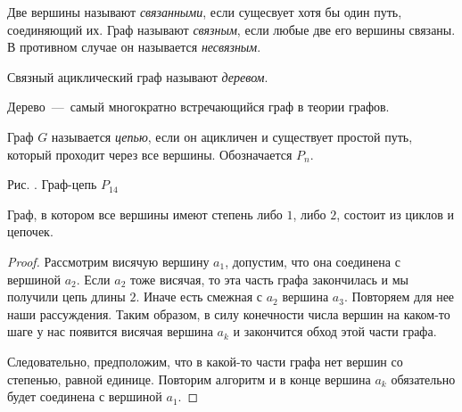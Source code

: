 \begin{definition}
	Две вершины называют \emph{связанными}, если сущесвует хотя бы один путь, соединяющий их. Граф называют \emph{связным}, если любые две его вершины связаны. В противном случае он называется \emph{несвязным}.
\end{definition}

\begin{definition}
	Связный ациклический граф называют \emph{деревом}.
\end{definition}

	Дерево~---~самый многократно встречающийся граф в теории графов. 
	
\begin{definition}
	Граф $G$ называется \emph{цепью}, если он ацикличен и существует простой путь, который проходит через все вершины. Обозначается $P_n$.
\end{definition}

\begin{center}
\newline
\newline
	\small Рис. \images. Граф-цепь $P_14$
\end{center}

\begin{statement}
	Граф, в котором все вершины имеют степень либо $1$, либо $2$, состоит из циклов и цепочек.

\begin{proof}
	Рассмотрим висячую вершину $a_1$, допустим, что она соединена с вершиной $a_2$. Если $a_2$ тоже висячая, то эта часть графа закончилась и мы получили цепь длины $2$. Иначе есть смежная с $a_2$ вершина $a_3$. Повторяем для нее наши рассуждения. Таким образом, в силу конечности числа вершин на каком-то шаге у нас появится висячая вершина $a_k$ и закончится обход этой части графа.
	
	 Следовательно, предположим, что в какой-то части графа нет вершин со степенью, равной единице. Повторим алгоритм и в конце вершина $a_k$ обязательно будет соединена с вершиной $a_1$.
\end{proof}
\end{statement}

